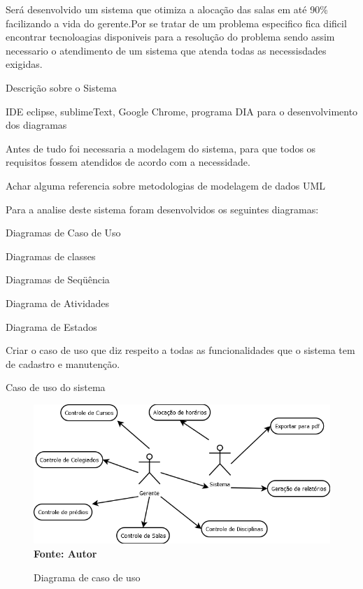 


Será desenvolvido um sistema que otimiza a alocação das salas em até 90\% facilizando a vida do gerente.Por se tratar de um problema especifico fica dificil encontrar tecnoloagias disponiveis para a resolução do problema sendo assim necessario o atendimento de um sistema que atenda todas as necessisdades exigidas.

	
	Descrição sobre o Sistema


	IDE eclipse, sublimeText, Google Chrome, programa DIA para o desenvolvimento dos diagramas\cite{alterar}


	Antes de tudo foi necessaria a modelagem do sistema, para que todos os requisitos fossem atendidos de acordo com a necessidade.\par

	Achar alguma referencia sobre metodologias de modelagem de dados UML\par\cite{alterar}

	Para a analise deste sistema foram desenvolvidos os seguintes diagramas:\par\cite{alterar}
	
	Diagramas de Caso de Uso\par
	Diagramas de classes\par
	Diagramas de Seqüência\par
	Diagrama de Atividades\par
	Diagrama de Estados\par



	Criar o caso de uso que diz respeito a todas as funcionalidades que o sistema tem de cadastro e manutenção.\par\cite{alterar}

	Caso de uso do sistema\par\cite{alterar}

	\begin{figure}[!htb]
		\centering
   		\caption[Diagrama de caso de uso]{Diagrama de caso de uso}
   		\label{fig:figura2}
   		\centering
   		\includegraphics[scale=0.5]{diagramaCasoUso.png}
   		\\ \textbf{\footnotesize Fonte: Autor}
	\end{figure}


